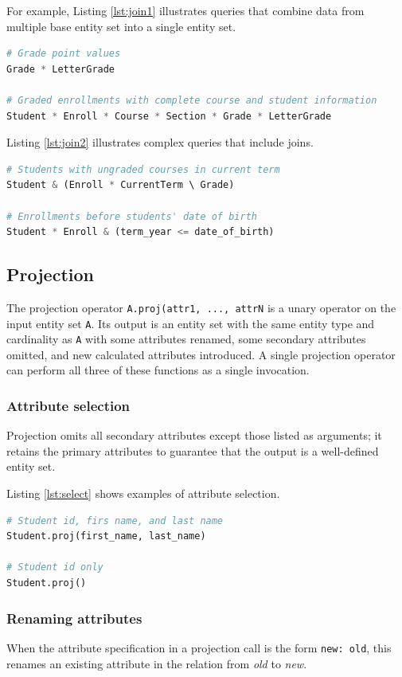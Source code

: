 \documentclass[letter,10pt]{article}
\begin{document}
For example, Listing \ref{lst:join1} illustrates queries that combine data from multiple base entity set into a single entity set.
\begin{lstlisting}[language=Python, caption={Combining entities.}, label={lst:join1}]
# Grade point values
Grade * LetterGrade

# Graded enrollments with complete course and student information
Student * Enroll * Course * Section * Grade * LetterGrade
\end{lstlisting}

Listing \ref{lst:join2} illustrates complex queries that include joins.
\begin{lstlisting}[language=Python, caption={Join in expressions.}, label={lst:join2}]
# Students with ungraded courses in current term
Student & (Enroll * CurrentTerm \ Grade)

# Enrollments before students' date of birth
Student * Enroll & (term_year <= date_of_birth)
\end{lstlisting}

\subsection{Projection}\label{sec:proj}
The projection operator \lstinline$A.proj(attr1, ..., attrN$ is a unary operator on the input entity set \lstinline$A$.  
Its output is an entity set with the same entity type and cardinality as \lstinline$A$ with some attributes renamed, some secondary attributes omitted, and new calculated attributes introduced.
A single projection operator can perform all three of these functions as a single invocation. 

\subsubsection{Attribute selection}
Projection omits all secondary attributes except those listed as arguments;
it retains the primary attributes to guarantee that the output is a well-defined entity set.

Listing \ref{lst:select} shows examples of attribute selection.
\begin{lstlisting}[language=Python, caption={Selecting  attributes.}, label={lst:select}]
# Student id, firs name, and last name
Student.proj(first_name, last_name)

# Student id only
Student.proj()
\end{lstlisting}

\subsubsection{Renaming attributes}
When the attribute specification in a projection call is the form \lstinline$new: old$, this renames an existing attribute in the relation from \emph{old} to \emph{new}.
\end{document}
